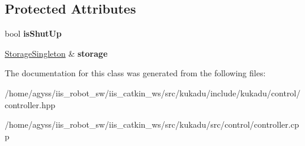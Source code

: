 \subsection*{Protected Attributes}
\begin{DoxyCompactItemize}
\item 
bool {\bfseries is\+Shut\+Up}\hypertarget{classkukadu_1_1Controller_abeb3dd890d6f8d50306b1b8f9d6b5512}{}\label{classkukadu_1_1Controller_abeb3dd890d6f8d50306b1b8f9d6b5512}

\item 
\hyperlink{classkukadu_1_1StorageSingleton}{Storage\+Singleton} \& {\bfseries storage}\hypertarget{classkukadu_1_1Controller_a15f9c5940d6584ccea9832de54525f27}{}\label{classkukadu_1_1Controller_a15f9c5940d6584ccea9832de54525f27}

\end{DoxyCompactItemize}


The documentation for this class was generated from the following files\+:\begin{DoxyCompactItemize}
\item 
/home/agyss/iis\+\_\+robot\+\_\+sw/iis\+\_\+catkin\+\_\+ws/src/kukadu/include/kukadu/control/controller.\+hpp\item 
/home/agyss/iis\+\_\+robot\+\_\+sw/iis\+\_\+catkin\+\_\+ws/src/kukadu/src/control/controller.\+cpp\end{DoxyCompactItemize}
